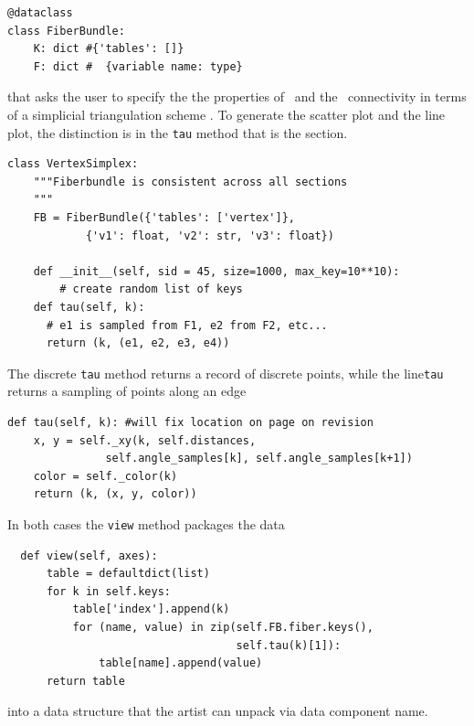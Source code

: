 \documentclass[journal]{vgtc}                %
\begin{document}
\begin{verbatim}
@dataclass
class FiberBundle:
    K: dict #{'tables': []}
    F: dict #  {variable name: type}
\end{verbatim}
that asks the user to specify the the properties of \dfiber\ and the \dbase\ connectivity in terms of a  simplicial triangulation scheme \cite{geometricaSimplicialComplexes}. To generate the scatter plot and the line plot, the distinction is in the \texttt{tau} method that is the section. 
\begin{verbatim}
class VertexSimplex: 
    """Fiberbundle is consistent across all sections
    """
    FB = FiberBundle({'tables': ['vertex']},  
            {'v1': float, 'v2': str, 'v3': float})
            
    def __init__(self, sid = 45, size=1000, max_key=10**10):
        # create random list of keys
    def tau(self, k):
      # e1 is sampled from F1, e2 from F2, etc...
      return (k, (e1, e2, e3, e4))
\end{verbatim}
The discrete \texttt{tau} method returns a record of discrete points, while the line\texttt{tau} returns a sampling of points along an edge \dbasepoint
\begin{verbatim}
def tau(self, k): #will fix location on page on revision
    x, y = self._xy(k, self.distances, 
               self.angle_samples[k], self.angle_samples[k+1]) 
    color = self._color(k) 
    return (k, (x, y, color))
\end{verbatim}
In both cases the \texttt{view} method packages the data
\begin{verbatim}
  def view(self, axes):
      table = defaultdict(list)
      for k in self.keys:
          table['index'].append(k)
          for (name, value) in zip(self.FB.fiber.keys(), 
                                   self.tau(k)[1]):
              table[name].append(value)
      return table
\end{verbatim}
into a data structure that the artist can unpack via data component name. 
\end{document}
